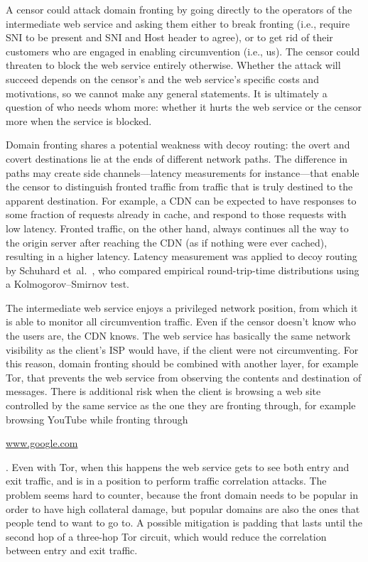 \documentclass[conference]{IEEEtran}
\def\urll#1{\begin{NoHyper}\url{#1}\end{NoHyper}}
\begin{document}
A censor could attack domain fronting by
going directly to the operators of the intermediate web service
and asking them either to break fronting
(i.e., require SNI to be present and SNI and Host header to agree),
or to get rid of their customers who are
engaged in enabling circumvention (i.e., us).
The censor could threaten to block the web service entirely otherwise.
Whether the attack will succeed depends on the censor's
and the web service's specific costs and motivations,
so we cannot make any general statements.
It is ultimately a question of who needs whom more:
whether it hurts the web service or the censor more
when the service is blocked.


Domain fronting shares a potential weakness with decoy routing:
the overt and covert destinations lie at the ends of different
network paths.
The difference in paths may create side channels---latency measurements for instance---that
enable the censor to
distinguish fronted traffic from traffic that is truly destined
to the apparent destination.
For example, a CDN can be expected to have responses
to some fraction of requests already in cache,
and respond to those requests with low latency.
Fronted traffic, on the other hand, always continues all the way
to the origin server after reaching the CDN (as if nothing were ever cached),
resulting in a higher latency.
Latency measurement was applied to decoy routing by Schuhard et~al.~\cite[Section~5]{ccs2012-decoys},
who compared empirical round-trip-time distributions using a
Kolmogorov--Smirnov test.

The intermediate web service enjoys a privileged network position,
from which it is able to monitor all circumvention traffic.
Even if the censor doesn't know who the users are, the CDN knows.
The web service has basically the same network visibility
as the client's ISP would have, if the client were not circumventing.
For this reason, domain fronting should be combined with another
layer, for example Tor, that prevents the web service from
observing the contents and destination of messages.
There is additional risk when the client is browsing a web site
controlled by the same service as the one they are fronting through,
for example browsing YouTube while fronting through \urll{www.google.com}.
Even with Tor, when this happens the web service gets to see
both entry and exit traffic, and is in a position to
perform traffic correlation attacks.
The problem seems hard to counter, because the front domain needs
to be popular in order to have high collateral damage,
but popular domains are also the ones that people tend to want to go to.
A possible mitigation is padding that lasts until
the second hop of a three-hop Tor circuit,
which would reduce the correlation between entry and exit traffic.
\end{document}
